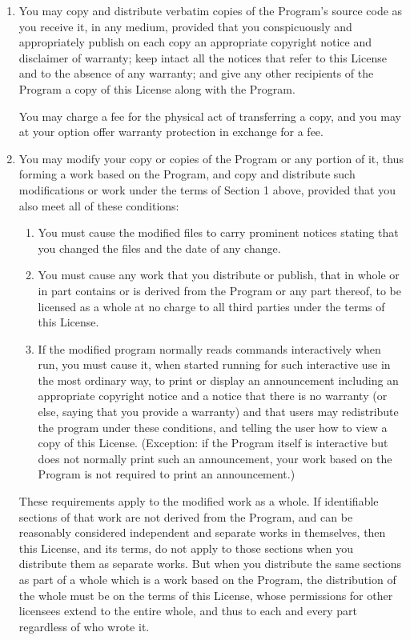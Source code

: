 \documentclass[oneside,english]{book}
\begin{document}
\begin{enumerate}
\item You may copy and distribute verbatim copies of the Program's source
code as you receive it, in any medium, provided that you conspicuously
and appropriately publish on each copy an appropriate copyright notice
and disclaimer of warranty; keep intact all the notices that refer
to this License and to the absence of any warranty; and give any other
recipients of the Program a copy of this License along with the Program.


You may charge a fee for the physical act of transferring a copy,
and you may at your option offer warranty protection in exchange for
a fee.

\item You may modify your copy or copies of the Program or any portion of
it, thus forming a work based on the Program, and copy and distribute
such modifications or work under the terms of Section 1 above, provided
that you also meet all of these conditions:

\begin{enumerate}
\item You must cause the modified files to carry prominent notices stating
that you changed the files and the date of any change.
\item You must cause any work that you distribute or publish, that in whole
or in part contains or is derived from the Program or any part thereof,
to be licensed as a whole at no charge to all third parties under
the terms of this License.
\item If the modified program normally reads commands interactively when
run, you must cause it, when started running for such interactive
use in the most ordinary way, to print or display an announcement
including an appropriate copyright notice and a notice that there
is no warranty (or else, saying that you provide a warranty) and that
users may redistribute the program under these conditions, and telling
the user how to view a copy of this License. (Exception: if the Program
itself is interactive but does not normally print such an announcement,
your work based on the Program is not required to print an announcement.)
\end{enumerate}
These requirements apply to the modified work as a whole. If identifiable
sections of that work are not derived from the Program, and can be
reasonably considered independent and separate works in themselves,
then this License, and its terms, do not apply to those sections when
you distribute them as separate works. But when you distribute the
same sections as part of a whole which is a work based on the Program,
the distribution of the whole must be on the terms of this License,
whose permissions for other licensees extend to the entire whole,
and thus to each and every part regardless of who wrote it.


\end{enumerate}
\end{document}

